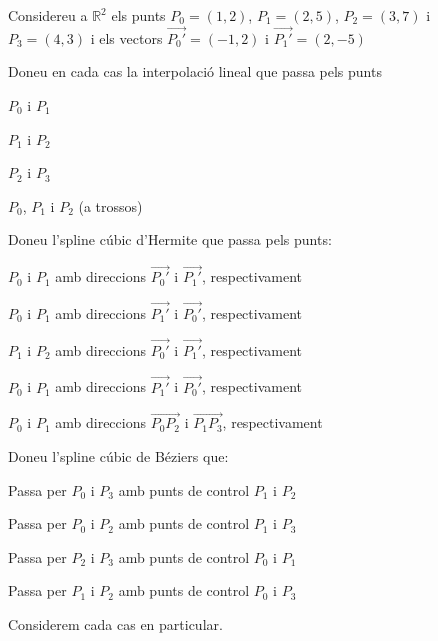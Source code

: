 \Exercise
\label{Ex:interpolacio}

Considereu a $\mathbb{R}^2$ els punts $P_0=(1,2)$, $P_1=(2,5)$, $P_2=(3,7)$ i $P_3=(4,3)$ i els vectors $\overrightarrow{P_0'}=(-1,2)$ i $\overrightarrow{P_1'}=(2,-5)$

\begin{llista}
  \item Doneu en cada cas la interpolació lineal que passa pels punts
  \begin{llista}
    \item $P_0$ i $P_1$
    \item $P_1$ i $P_2$
    \item $P_2$ i $P_3$
    \item $P_0$, $P_1$ i $P_2$ (a trossos)
  \end{llista}
  \item Doneu l'spline cúbic d'Hermite que passa pels punts:
  \begin{llista}
    \item $P_0$ i $P_1$ amb direccions $\overrightarrow{P_0'}$ i $\overrightarrow{P_1'}$, respectivament
    \item $P_0$ i $P_1$ amb direccions $\overrightarrow{P_1'}$ i $\overrightarrow{P_0'}$, respectivament
    \item $P_1$ i $P_2$ amb direccions $\overrightarrow{P_0'}$ i $\overrightarrow{P_1'}$, respectivament
    \item $P_0$ i $P_1$ amb direccions $\overrightarrow{P_1'}$ i $\overrightarrow{P_0'}$, respectivament
    \item $P_0$ i $P_1$ amb direccions $\overrightarrow{P_0P_2}$ i $\overrightarrow{P_1P_3}$, respectivament
  \end{llista}
  \item Doneu l'spline cúbic de Béziers que:
  \begin{llista}
    \item Passa per $P_0$ i $P_3$ amb punts de control $P_1$ i $P_2$
    \item Passa per $P_0$ i $P_2$ amb punts de control $P_1$ i $P_3$
    \item Passa per $P_2$ i $P_3$ amb punts de control $P_0$ i $P_1$
    \item Passa per $P_1$ i $P_2$ amb punts de control $P_0$ i $P_3$
  \end{llista}

\end{llista}

\Answer Considerem cada cas en particular.

